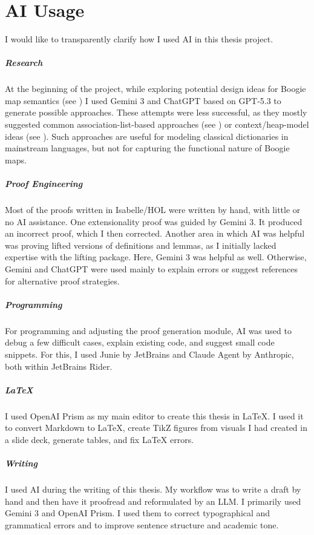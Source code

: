 \chapter*{AI Usage}

I would like to transparently clarify how I used AI in this thesis project.

\paragraph{Research} At the beginning of the project, while exploring potential design ideas for Boogie map semantics
(see )
I used Gemini 3 and ChatGPT based on GPT-5.3 to generate possible approaches.
These attempts were less successful, as they mostly suggested common
association-list-based approaches (see ) or context/heap-model ideas (see ).
Such approaches are useful for modeling classical dictionaries in mainstream languages,
but not for capturing the functional nature of Boogie maps.

\paragraph{Proof Engineering} Most of the proofs written in Isabelle/HOL were written by hand, with little or no AI assistance.
One extensionality proof was guided by Gemini 3. It produced an incorrect proof, which I then corrected.
Another area in which AI was helpful was proving lifted versions of definitions and lemmas, as I initially lacked expertise with the lifting package.
Here, Gemini 3 was helpful as well.
Otherwise, Gemini and ChatGPT were used mainly to explain errors or suggest references for alternative proof strategies.

\paragraph{Programming} For programming and adjusting the proof generation module,
AI was used to debug a few difficult cases, explain existing code, and suggest small code snippets.
For this, I used Junie by JetBrains and Claude Agent by Anthropic, both within JetBrains Rider.

\paragraph{\LaTeX} I used OpenAI Prism as my main editor to create this thesis in \LaTeX.
I used it to convert Markdown to \LaTeX, create TikZ figures from visuals I had created in a slide deck,
generate tables, and fix \LaTeX{} errors.

\paragraph{Writing} I used AI during the writing of this thesis.
My workflow was to write a draft by hand and then have it proofread and reformulated by an LLM.
I primarily used Gemini 3 and OpenAI Prism.
I used them to correct typographical and grammatical errors and to improve sentence structure
and academic tone.
